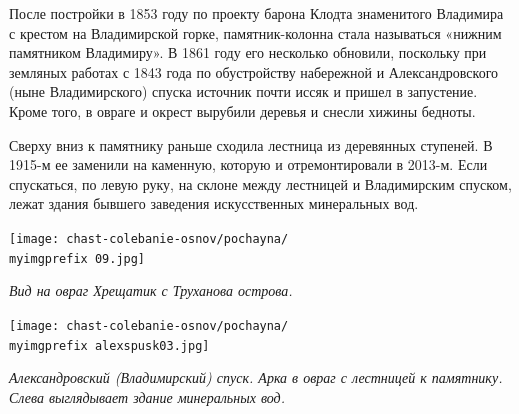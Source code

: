 После постройки в 1853 году по проекту барона Клодта знаменитого Владимира с крестом на Владимирской горке, памятник-колонна стала называться «нижним памятником Владимиру». В 1861 году его несколько обновили, поскольку при земляных работах с 1843 года по обустройству набережной и Александровского (ныне Владимирского) спуска источник почти иссяк и пришел в запустение. Кроме того, в овраге и окрест вырубили деревья и снесли хижины бедноты.

Сверху вниз к памятнику раньше сходила лестница из деревянных ступеней. В 1915-м ее заменили на каменную, которую и отремонтировали в 2013-м. Если спускаться, по левую руку, на склоне между лестницей и Владимирским спуском, лежат здания бывшего заведения искусственных минеральных вод. 

\newpage

\begin{center}
\texttt{[image: chast-colebanie-osnov/pochayna/\\myimgprefix 09.jpg]}

\textit{Вид на овраг Хрещатик с Труханова острова.}
\end{center}

\begin{center}
\texttt{[image: chast-colebanie-osnov/pochayna/\\myimgprefix alexspusk03.jpg]}

\textit{Александровский (Владимирский) спуск. Арка в овраг с лестницей к памятнику. Слева выглядывает здание минеральных вод.}
\end{center}

